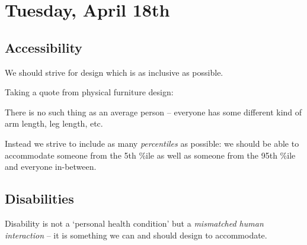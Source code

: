 \section{Tuesday, April 18th}
\subsection{Accessibility}
We should strive for design which is as inclusive as possible.

Taking a quote from physical furniture design:
\begin{shaded}
There is no such thing as an average person -- everyone has some different kind of arm length, leg length, etc.
\end{shaded}

Instead we strive to include as many  \textit{percentiles} as possible: we should be able to accommodate someone from the 5th \%ile as well as someone from the 95th \%ile and everyone in-between.

\subsection{Disabilities}
Disability is not a `personal health condition' but a \textit{mismatched human interaction} -- it is something we can and should design to accommodate.

